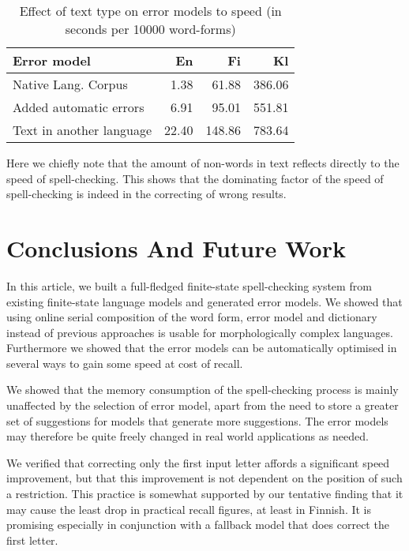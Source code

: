 \documentclass[11pt]{article}
\begin{document}
\begin{table}[h]
\begin{center}
\begin{scriptsize}
\begin{tabular}{|l|rrr|}
\hline
\bf Error model & \bf En & \bf Fi & \bf Kl  \\ 
\hline
Native Lang. Corpus &
1.38&61.88&386.06
\\
Added automatic errors &
6.91&95.01&551.81
\\
Text in another language &
22.40&148.86&783.64
\\
\hline
\end{tabular}
\end{scriptsize}
\end{center}
\caption{\label{table:language-vs-text-type} Effect of text type on
error models to speed (in seconds per 10000 word-forms)}
\end{table}

Here we chiefly note that the amount of non-words in text reflects directly to
the speed of spell-checking. This shows that the dominating factor of the
speed of spell-checking is indeed in the correcting of wrong results.

\section{Conclusions And Future Work}
\label{sec:conclusions}

In this article, we built a full-fledged finite-state spell-checking system from
existing finite-state language models and generated error models. We showed
that using online serial composition of the word form, error model and
dictionary instead of previous approaches is usable for morphologically
complex languages. Furthermore
we showed that the error models can be automatically optimised in several ways
to gain some speed at cost of recall.

We showed that the memory consumption of the spell-checking process is mainly
unaffected by the selection of error model, apart from the need to store
a greater set of suggestions for models that generate more suggestions. The
error models may therefore be quite freely changed in real world
applications as needed.

We verified that correcting only the first input letter affords a significant
speed improvement, but that this improvement is not dependent on the position
of such a restriction. This practice is somewhat supported by our tentative
finding that it may cause the least drop in practical recall figures, at least
in Finnish. It is promising especially in conjunction with a fallback model
that does correct the first letter.
\end{document}
